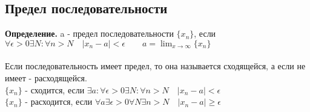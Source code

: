 \documentclass[../main.tex]{subfiles}
\begin{document}
\subsection{Предел последовательности}
\textbf{Определение.} a - предел последовательности $\{x_{n}\}$, если $\forall \epsilon >0 \exists N : \forall n>N \quad |x_{n}-a|<\epsilon\qquad  a=\lim_{x\to \infty}\{x_{n}\}$\\\\
Если последовательность имеет предел, то она называется сходящейся, а если не имеет - расходящейся.\\
$\{x_{n}\}$ - сходится, если $\exists a:\forall \epsilon >0 \exists N:\forall n> N\quad |x_{n}-a|<\epsilon$\\
$\{x_{n}\}$ - расходится, если $\forall a \exists \epsilon > 0 \forall N \exists n > N \quad |x_{n}-a| \geqslant \epsilon$
\end{document}
